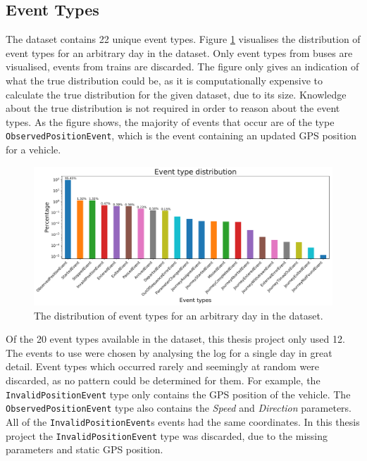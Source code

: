 \subsection{Event Types}
The dataset contains 22 unique event types.
Figure \ref{fig:types-barplot} visualises the distribution of event types for an arbitrary day  in the dataset.
Only event types from buses are visualised, events from trains are discarded.
The figure only gives an indication of what the true distribution could be, as it is computationally expensive to calculate the true distribution for the given dataset, due to its size.
Knowledge about the true distribution is not required in order to reason about the event types.
As the figure shows, the majority of events that occur are of the type \texttt{ObservedPositionEvent}, which is the event containing an updated GPS position for a vehicle.

\begin{figure}[ht!]
    \centering
    \includegraphics[width=\textwidth]{figures/types_barplot}
    \caption[The distribution of event types for an arbitrary day in the dataset]
    {\small The distribution of event types for an arbitrary day in the dataset.}
    \label{fig:types-barplot}
\end{figure}

Of the 20 event types available in the dataset, this thesis project only used 12.
The events to use were chosen by analysing the log for a single day in great detail.
Event types which occurred rarely and seemingly at random were discarded, as no pattern could be determined for them.
For example, the \texttt{InvalidPositionEvent} type only contains the GPS position of the vehicle.
The \texttt{ObservedPositionEvent} type also contains the \textit{Speed} and \textit{Direction} parameters.
All of the \texttt{InvalidPositionEvent}s events had the same coordinates.
In this thesis project the \texttt{InvalidPositionEvent} type was discarded, due to the missing parameters and static GPS position.

